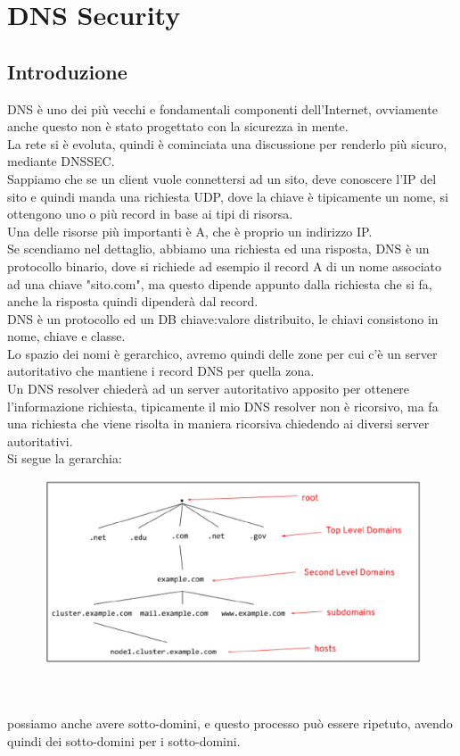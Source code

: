 \documentclass[12pt, oneside]{extbook} %
\begin{document}
\chapter{DNS Security}

\section{Introduzione}
DNS è uno dei più vecchi e fondamentali componenti dell'Internet, ovviamente anche questo non è stato progettato con la sicurezza in mente.
\\La rete si è evoluta, quindi è cominciata una discussione per renderlo più sicuro, mediante DNSSEC.
\\Sappiamo che se un client vuole connettersi ad un sito, deve conoscere l'IP del sito e quindi manda una richiesta UDP, dove la chiave è tipicamente un nome, si ottengono uno o più record in base ai tipi di risorsa.
\\Una delle risorse più importanti è A, che è proprio un indirizzo IP.
\\Se scendiamo nel dettaglio, abbiamo una richiesta ed una risposta, DNS è un protocollo binario, dove si richiede ad esempio il record A di un nome associato ad una chiave "sito.com", ma questo dipende appunto dalla richiesta che si fa, anche la risposta quindi dipenderà dal record.
\\DNS è un protocollo ed un DB chiave:valore distribuito, le chiavi consistono in nome, chiave e classe.
\\Lo spazio dei nomi è gerarchico, avremo quindi delle zone per cui c'è un server autoritativo che mantiene i record DNS per quella zona.
\\Un DNS resolver chiederà ad un server autoritativo apposito per ottenere l'informazione richiesta, tipicamente il mio DNS resolver non è ricorsivo, ma fa una richiesta che viene risolta in maniera ricorsiva chiedendo ai diversi server autoritativi.
\\Si segue la gerarchia:\\
\begin{figure}[h!]
    \centering
    \includegraphics[scale=0.5]{../../immagini/dns_hier}
\end{figure}\\\\
possiamo anche avere sotto-domini, e questo processo può essere ripetuto, avendo quindi dei sotto-domini per i sotto-domini.
\end{document}
